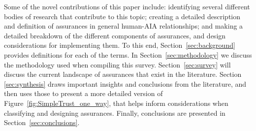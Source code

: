     Some of the novel contributions of this paper include: identifying several different bodies of research that contribute to this topic; creating a detailed description and definition of assurances in general human-AIA relationships; and making a detailed breakdown of the different components of assurances, and design considerations for implementing them. To this end, Section~\ref{sec:background} provides definitions for each of the terms. In Section~\ref{sec:methodology} we discuss the methodology used when compiling this survey.  Section~\ref{sec:survey} will discuss the current landscape of assurances that exist in the literature. 
Section \ref{sec:synthesis} draws important insights and conclusions from the literature, and then uses those to present a more detailed version of Figure~\ref{fig:SimpleTrust_one_way}, that helps inform considerations when classifying and designing assurances. 
Finally, conclusions are presented in Section~\ref{sec:conclusions}.
